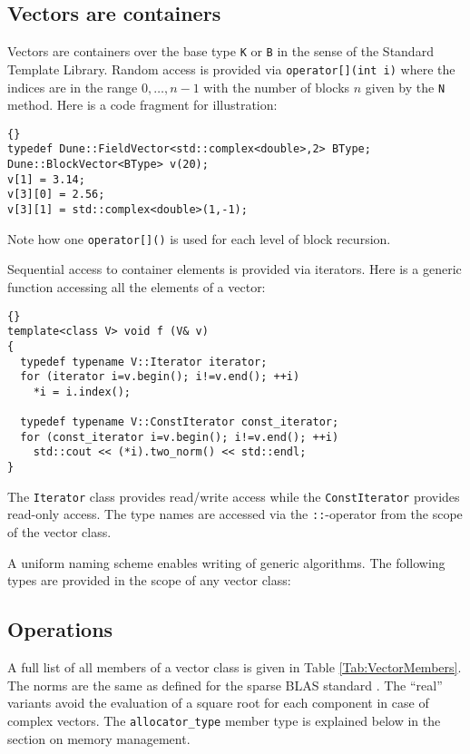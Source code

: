 \documentclass[11pt]{article}
\begin{document}
\subsection{Vectors are containers}

Vectors are containers over the base type \lstinline!K! or
\lstinline!B! in the sense of the Standard Template Library. Random
access is provided via \lstinline!operator[](int i)! where the indices
are in the range $0,\ldots,n-1$ with the number of blocks $n$ given by
the \lstinline!N! method. Here is a code fragment for illustration:
\begin{lstlisting}{}
typedef Dune::FieldVector<std::complex<double>,2> BType;
Dune::BlockVector<BType> v(20);
v[1] = 3.14;
v[3][0] = 2.56;
v[3][1] = std::complex<double>(1,-1);
\end{lstlisting}
Note how one \lstinline!operator[]()! is used for each level of block
recursion. 

Sequential access to container elements is provided via
iterators. Here is a generic function accessing all the elements of a
vector:
\begin{lstlisting}{}
template<class V> void f (V& v)
{
  typedef typename V::Iterator iterator;
  for (iterator i=v.begin(); i!=v.end(); ++i)
    *i = i.index();
  
  typedef typename V::ConstIterator const_iterator;
  for (const_iterator i=v.begin(); i!=v.end(); ++i)
    std::cout << (*i).two_norm() << std::endl;
}
\end{lstlisting}
The \lstinline!Iterator! class provides read/write access while the
\lstinline!ConstIterator! provides read-only access. The type names
are accessed via the \lstinline!::!-operator from the scope of the
vector class.

A uniform naming scheme enables writing of generic algorithms. The
following types are provided in the scope of any vector class:

\subsection{Operations}

A full list of all members of a vector class is given in Table
\ref{Tab:VectorMembers}. The norms are the same as defined for the
sparse BLAS standard \cite{BLASTForum}. The ``real'' variants avoid
the evaluation of a square root for each component in case of complex
vectors. The \lstinline!allocator_type! member type is explained below
in the section on memory management.
\end{document}
